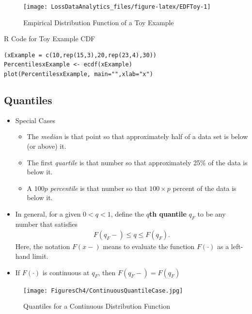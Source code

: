 \documentclass[]{book}
\begin{document}
\begin{figure}

{\centering \texttt{[image: LossDataAnalytics\_files/figure-latex/EDFToy-1]} 

}

\caption{Empirical Distribution Function of a Toy Example}\label{fig:EDFToy}
\end{figure}

R Code for Toy Example CDF

\hypertarget{toggleToy}{}
\begin{verbatim}
(xExample = c(10,rep(15,3),20,rep(23,4),30))
PercentilesxExample <- ecdf(xExample)
plot(PercentilesxExample, main="",xlab="x")
\end{verbatim}

\subsection{Quantiles}\label{quantiles-1}

\begin{itemize}
\item
  Special Cases

  \begin{itemize}
  \item
    The \emph{median} is that point so that approximately half of a data
    set is below (or above) it.
  \item
    The first \emph{quartile} is that number so that approximately 25\%
    of the data is below it.
  \item
    A \(100p\) \emph{percentile} is that number so that \(100 \times p\)
    percent of the data is below it.
  \end{itemize}
\item
  In general, for a given \(0<q<1\), define the \textbf{\(q\)th
  quantile} \(q_F\) to be any number that satisfies \[\begin{aligned}
  \label{E:Quantile}
  F(q_F-) \le q \le F(q_F).\end{aligned}\] Here, the notation \(F(x-)\)
  means to evaluate the function \(F(\cdot)\) as a left-hand limit.
\item
  If \(F(\cdot)\) is continuous at \(q_F\), then \(F(q_F-) = F(q_F)\)
\end{itemize}

\begin{figure}
\centering
\texttt{[image: FiguresCh4/ContinuousQuantileCase.jpg]}
\caption{Quantiles for a Continuous Distribution Function}
\end{figure}
\end{document}
